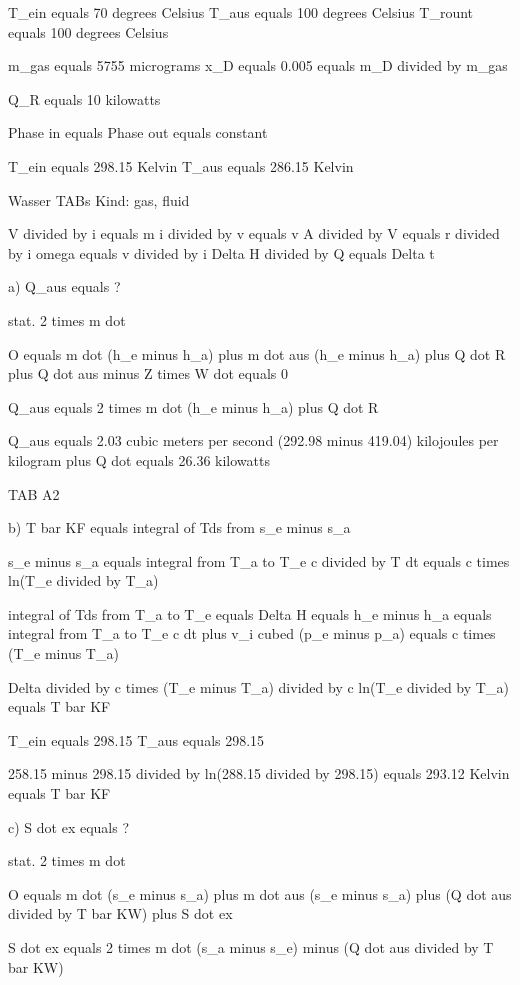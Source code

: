 T_ein equals 70 degrees Celsius  
T_aus equals 100 degrees Celsius  
T_rount equals 100 degrees Celsius  

m_gas equals 5755 micrograms  
x_D equals 0.005 equals m_D divided by m_gas  

Q_R equals 10 kilowatts  

Phase in equals Phase out equals constant  

T_ein equals 298.15 Kelvin  
T_aus equals 286.15 Kelvin  

Wasser TABs  
Kind: gas, fluid  

V divided by i equals m  
i divided by v equals v  
A divided by V equals r divided by i  
omega equals v divided by i  
Delta H divided by Q equals Delta t  

a) Q_aus equals ?  

stat.  
2 times m dot  

O equals m dot (h_e minus h_a) plus m dot aus (h_e minus h_a) plus Q dot R plus Q dot aus minus Z times W dot equals 0  

Q_aus equals 2 times m dot (h_e minus h_a) plus Q dot R  

Q_aus equals 2.03 cubic meters per second (292.98 minus 419.04) kilojoules per kilogram plus Q dot equals 26.36 kilowatts  

TAB A2  

b) T bar KF equals integral of Tds from s_e minus s_a  

s_e minus s_a equals integral from T_a to T_e c divided by T dt equals c times ln(T_e divided by T_a)  

integral of Tds from T_a to T_e equals Delta H equals h_e minus h_a equals integral from T_a to T_e c dt plus v_i cubed (p_e minus p_a) equals c times (T_e minus T_a)  

Delta divided by c times (T_e minus T_a) divided by c ln(T_e divided by T_a) equals T bar KF  

T_ein equals 298.15  
T_aus equals 298.15  

258.15 minus 298.15 divided by ln(288.15 divided by 298.15) equals 293.12 Kelvin equals T bar KF  

c) S dot ex equals ?  

stat.  
2 times m dot  

O equals m dot (s_e minus s_a) plus m dot aus (s_e minus s_a) plus (Q dot aus divided by T bar KW) plus S dot ex  

S dot ex equals 2 times m dot (s_a minus s_e) minus (Q dot aus divided by T bar KW)  


